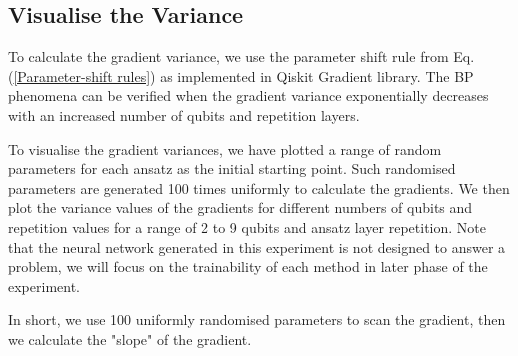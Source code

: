 \subsection{Visualise the Variance}
To calculate the gradient variance, we use the parameter shift rule from Eq. (\ref{Parameter-shift rules}) as implemented in Qiskit Gradient library.
The BP phenomena can be verified when the gradient variance exponentially decreases with an increased number of qubits and repetition layers.

To visualise the gradient variances, we have plotted a range of random parameters for each ansatz as the initial starting point.
Such randomised parameters are generated 100 times uniformly to calculate the gradients.
We then plot the variance values of the gradients for different numbers of qubits and repetition values for a range of 2 to 9 qubits and ansatz layer repetition.
Note that the neural network generated in this experiment is not designed to answer a problem, we will focus on the trainability of each method in later phase of the experiment.

In short, we use 100 uniformly randomised parameters to scan the gradient, then we calculate the "slope" of the gradient.